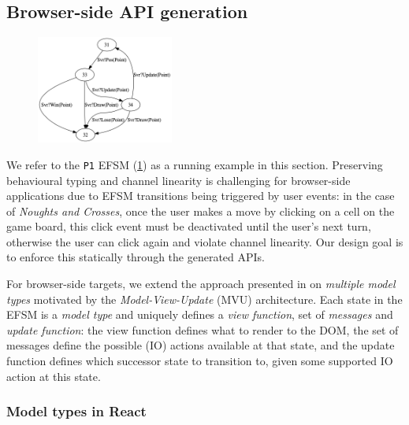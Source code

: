 \subsection{Browser-side API generation}

\label{section:browser}

\begin{figure}
  \begin{center}
    \includegraphics[width=0.4\textwidth]{figures/efsm_p1.png}
  \end{center}

  \label{fig:efsmp1}
\end{figure}

We refer to the \texttt{P1} EFSM (\cref{fig:efsmp1}) as a running example in
this section.
Preserving behavioural typing and channel linearity is challenging
for browser-side applications due to EFSM transitions being triggered by user
events:
in the case of \textit{Noughts and Crosses}, once the user makes a move by
clicking on a cell on the game board, this click event must be deactivated
until the user's next turn, otherwise the user can click again and violate
channel linearity.
Our design goal is to enforce this statically through the generated APIs.

For browser-side targets, we extend the approach presented in \cite{MVU2019} on
\textit{multiple model types} motivated by the \textit{Model-View-Update} (MVU)
architecture.
Each state in the EFSM is a \emph{model type} and uniquely defines a
\textit{view function}, set of \textit{messages} and \textit{update function}:
the view function defines what to render to the DOM, the set of messages define
the possible (IO) actions available at that state, and the update function
defines which successor state to transition to, given some supported IO action
at this state.

\subsubsection{Model types in React}

